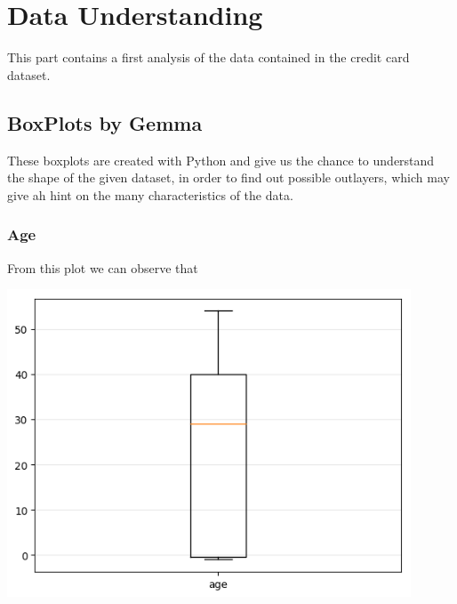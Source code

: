 \documentclass[a4paper]{article}
\begin{document}

\tableofcontents
\newpage




\section{Data Understanding}

This part contains a first analysis of the data contained in the credit card dataset.

\subsection{BoxPlots by Gemma}
These boxplots are created with Python and give us the chance to understand the shape of the given dataset, in order to find out possible outlayers, which may give ah hint on the many characteristics of the data.
\subsubsection{Age}
From this plot we can observe that
\begin{center}
\includegraphics[width=0.9\textwidth]{../Code/boxPlotsGemma/boxplots/age.png}
\end{center}
\end{document}
